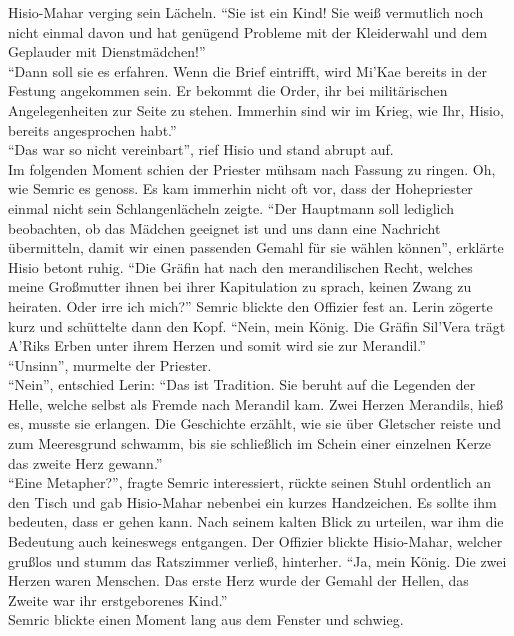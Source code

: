 Hisio-Mahar verging sein Lächeln. ``Sie ist ein Kind! Sie weiß vermutlich noch nicht einmal davon 
und hat genügend Probleme mit der Kleiderwahl und dem Geplauder mit Dienstmädchen!''\\
``Dann soll sie es erfahren. Wenn die Brief eintrifft, wird Mi'Kae bereits in der Festung 
angekommen sein. Er bekommt die Order, ihr bei militärischen Angelegenheiten zur Seite zu stehen. 
Immerhin sind wir im Krieg, wie Ihr, Hisio, bereits angesprochen habt.''\\
``Das war so nicht vereinbart'', rief Hisio und stand abrupt auf.\\
Im folgenden Moment schien der Priester mühsam nach Fassung zu ringen. Oh, wie Semric es genoss. Es 
kam immerhin nicht oft vor, dass der Hohepriester einmal nicht sein Schlangenlächeln zeigte.
``Der Hauptmann soll lediglich beobachten, ob das Mädchen geeignet ist und uns dann eine Nachricht 
übermitteln, damit wir einen passenden Gemahl für sie wählen können'', erklärte Hisio betont ruhig.
``Die Gräfin hat nach den merandilischen Recht, welches meine Großmutter ihnen bei ihrer 
Kapitulation zu sprach, keinen Zwang zu heiraten. Oder irre ich mich?'' Semric blickte den Offizier 
fest an.
Lerin zögerte kurz und schüttelte dann den Kopf. ``Nein, mein König. Die Gräfin Sil'Vera trägt 
A'Riks Erben unter ihrem Herzen und somit wird sie zur Merandil.''\\
``Unsinn'', murmelte der Priester.\\
``Nein'', entschied Lerin: ``Das ist Tradition. Sie beruht auf die Legenden der Helle, welche 
selbst als Fremde nach Merandil kam. Zwei Herzen Merandils, hieß es, musste sie erlangen. Die 
Geschichte erzählt, wie sie über Gletscher reiste und zum Meeresgrund schwamm, bis sie schließlich 
im Schein einer einzelnen Kerze das zweite Herz gewann.''\\
``Eine Metapher?'', fragte Semric interessiert, rückte seinen Stuhl ordentlich an den Tisch und gab 
Hisio-Mahar nebenbei ein kurzes Handzeichen. Es sollte ihm bedeuten, dass er gehen kann. Nach 
seinem kalten Blick zu urteilen, war ihm die Bedeutung auch keineswegs entgangen. Der Offizier 
blickte Hisio-Mahar, welcher grußlos und stumm das Ratszimmer verließ, hinterher. ``Ja, mein König. 
Die zwei Herzen waren Menschen. Das erste Herz wurde der Gemahl der Hellen, das Zweite war ihr 
erstgeborenes Kind.''\\
Semric blickte einen Moment lang aus dem Fenster und schwieg.

